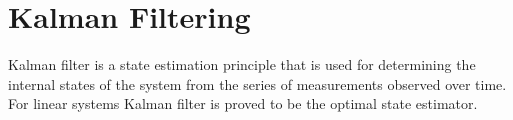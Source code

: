 \chapter{Kalman Filtering}
Kalman filter is a state estimation principle that is used for determining the internal states of the system from the series of measurements observed over time. For linear systems Kalman filter is proved to be the optimal state estimator.